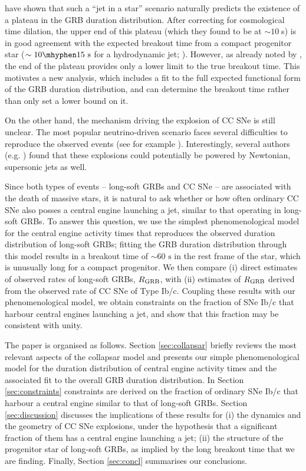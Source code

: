 \documentclass[useAMS,usenatbib]{mn2e}
\begin{document}
\citet{Bromberg2012} have shown that such a ``jet in a star'' scenario naturally predicts the existence of a plateau in the GRB duration distribution. After correcting for cosmological time dilation, the upper end of this plateau (which they found to be at $\sim10\;$s) is in good agreement with the expected breakout time from a compact progenitor star ($\sim10\mhyphen 15\text{ s}$ for a hydrodynamic jet; \citealt{Bromberg2011,Bromberg2015}). However, as already noted by \citet{Bromberg2012}, the end of the plateau provides only a lower limit to the true breakout time. This motivates a new analysis, which includes a fit to the full expected functional form of the GRB duration distribution, and can determine the breakout time rather than only set a lower bound on it.

On the other hand, the mechanism driving the explosion of CC SNe is still unclear. The most popular neutrino-driven scenario \citep{BetheWilson1985} faces several difficulties to reproduce the observed events (see for example \citealt{Papish2015}). Interestingly, several authors (e.g. \citealt{Khokhlov1999,MaedaNomoto2003,Couch2009}) found that these explosions could potentially be powered by Newtonian, supersonic jets as well.

Since both types of events -- long-soft GRBs and CC SNe -- are associated with the death of massive stars, it is natural to ask whether or how often ordinary CC SNe also posses a central engine launching a jet, similar to that operating in long-soft GRBs. To answer this question, we use the simplest phenomenological model for the central engine activity times that reproduces the observed duration distribution of long-soft GRBs; fitting the GRB duration distribution through this model results in a breakout time of $\sim 60\text{ s}$ in the rest frame of the star, which is unusually long for a compact progenitor. We then compare (i) direct estimates of observed rates of long-soft GRBs, $R_{\rm GRB}$, with (ii) estimates of $R_{\rm GRB}$ derived from the observed rate of CC SNe of Type Ib/c. Coupling these results with our phenomenological model, we obtain constraints on the fraction of SNe Ib/c that harbour central engines launching a jet, and show that this fraction may be consistent with unity.

The paper is organised as follows. Section \ref{sec:collapsar} briefly reviews the most relevant aspects of the collapsar model and presents our simple phenomenological model for the duration distribution of central engine activity times and the associated fit to the overall GRB duration distribution. In Section \ref{sec:constraints} constraints are derived on the fraction of ordinary SNe Ib/c that harbour a central engine similar to that of long-soft GRBs. Section \ref{sec:discussion} discusses the implications of these results for (i) the dynamics and the geometry of CC SNe explosions, under the hypothesis that a significant fraction of them has a central engine launching a jet; (ii) the structure of the progenitor star of long-soft GRBs, as implied by the long breakout time that we are finding. Finally, Section \ref{sec:concl} summarises our conclusions.
\end{document}

